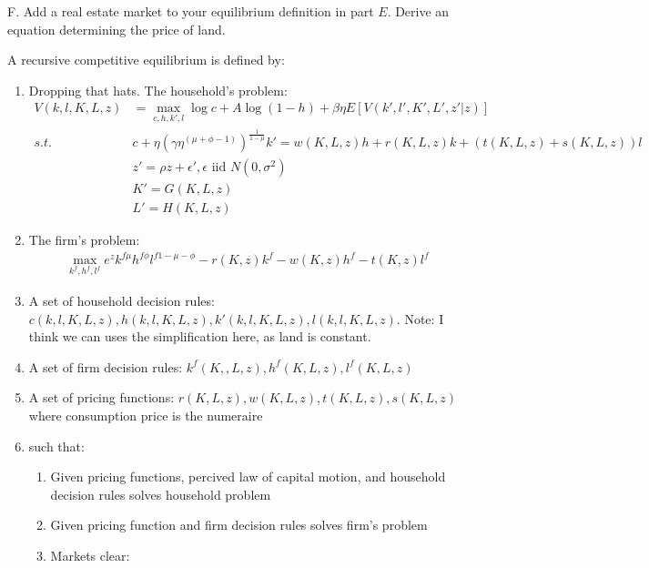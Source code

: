\documentclass[answers]{exam}
\begin{document}
\begin{questions}
\begin{solution}
\begin{enumerate}
\begin{enumerate}
        \end{enumerate}
    \end{enumerate}
\end{solution}
F. Add a real estate market to your equilibrium definition in part $E$. Derive an equation determining the price of land.
\begin{solution}
    A recursive competitive equilibrium is defined by:
    \begin{enumerate}
        \item Dropping that hats. The household's problem:
        \begin{align*}
            V(k,l,K,L,z) &= \max_{c,h,k',l} \log c + A \log(1-h) + \beta \eta E[V(k',l',K',L',z'|z)]\\
            s.t.\ &c + \eta  (\gamma \eta^{(\mu+\phi-1)})^\frac{1}{1-\mu} k' = w(K,L,z)h + r(K,L,z)k + (t(K,L,z) + s(K,L,z))l\\
            &z' = \rho z + \epsilon', \epsilon \text{ iid } N(0,\sigma^2)\\
            &K' = G(K,L,z)\\
            &L' = H(K,L,z)
        \end{align*}
        \item The firm's problem:
        \begin{align*}
            \max_{k^f,h^f,l^f} e^{z} k^{f\mu} h^{f\phi}l^{f1- \mu -\phi} - r(K,z)k^f - w(K,z)h^f - t(K,z)l^f
        \end{align*}
        \item A set of household decision rules: $c(k,l,K,L,z), h(k,l,K,L,z), k'(k,l,K,L,z), l(k,l,K,L,z)$. Note: I think we can uses the simplification here, as land is constant.
        \item A set of firm decision rules: $k^f(K,,L,z), h^f(K,L,z), l^f(K,L,z)$
        \item A set of pricing functions: $r(K,L,z),  w(K,L,z), t(K,L,z), s(K,L,z)$ where consumption price is the numeraire
        \item such that:
        \begin{enumerate}
            \item Given pricing functions, percived law of capital motion, and household decision rules solves household problem
            \item Given pricing function and firm decision rules solves firm's problem
            \item Markets clear:
            \begin{enumerate}

\end{enumerate}
\end{enumerate}
\end{enumerate}
\end{solution}
\end{questions}
\end{document}
